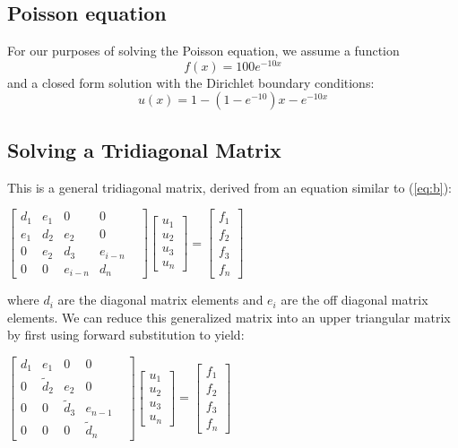 \documentclass[10pt,showpacs,preprintnumbers,footinbib,amsmath,amssymb,aps,prl,twocolumn,groupedaddress,superscriptaddress,showkeys]{revtex4-1}
\begin{document}
	\subsection{Poisson equation}	
For our purposes of solving the Poisson equation, we assume a function \begin{equation}
	f(x)=100e^{-10x}
	\end{equation}
and a closed form solution with the Dirichlet boundary conditions:
	\begin{equation}
	u(x)=1-(1-e^{-10})x-e^{-10x}
	\end{equation}
	\subsection{Solving a Tridiagonal Matrix}
This is a general tridiagonal matrix, derived from an equation similar to (\ref{eq:b}):
	\begin{center}
		$\begin{bmatrix}
			d_{1}& e_{1} & 0 & 0 \\
			e_{1} & d_{2} & e_{2} & 0 & \\
			0 & e_{2} & d_{3} & e_{i-n}   \\
			0 & 0 & e_{i-n} & d_{n} 
	
		\end{bmatrix}
		 \begin{bmatrix}
			u_{1} \\
			u_{2} \\
			u_{3} \\
			u_{n} 
		\end{bmatrix} =
		\begin{bmatrix}
			f_{1} \\
			f_{2} \\
			f_{3} \\
			f_{n}
		\end{bmatrix}$
		\end{center}

where $d_{i}$ are the diagonal matrix elements and $e_{i}$ are the off diagonal matrix elements. We can reduce this generalized matrix into an upper triangular matrix by first using forward substitution to yield:
	
\begin{center}
		$\begin{bmatrix}
			d_{1}& e_{1} & 0 & 0 \\
			0 & \tilde{d}_{2} & e_{2} & 0 & \\
			0 & 0 & \tilde{d}_{3} & e_{n-1}   \\
			0 & 0 & 0 & \tilde{d}_{n} 
	
		\end{bmatrix}
		 \begin{bmatrix}
			u_{1} \\
			u_{2} \\
			u_{3} \\
			u_{n} 
		\end{bmatrix} =
		\begin{bmatrix}
			f_{1} \\
			f_{2} \\
			f_{3} \\
			f_{n}
		\end{bmatrix}$
		\end{center}
\end{document}
